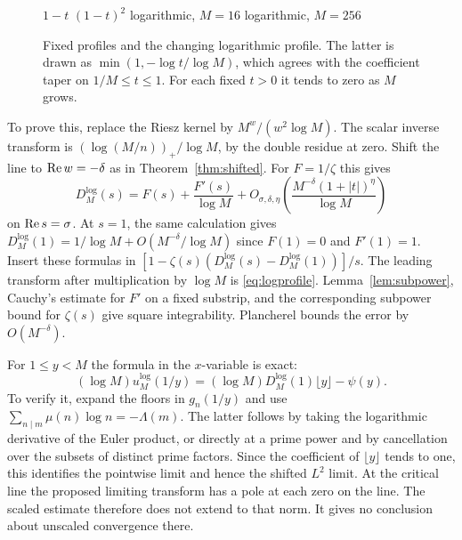 \begin{figure}[ht]
\centering
{}
\par\smallskip
{\small
\textcolor{blue!65!black}{\(1-t\)}\quad
\textcolor{teal!75!black}{\((1-t)^2\)}\quad
\textcolor{orange!85!black}{logarithmic, \(M=16\)}\quad
\textcolor{red!65!black}{logarithmic, \(M=256\)}}
\caption{Fixed profiles and the changing logarithmic profile. The latter is drawn as \(\min(1,-\log t/\log M)\), which agrees with the coefficient taper on \(1/M\le t\le1\). For each fixed \(t>0\) it tends to zero as \(M\) grows.}
\label{fig:tapers}
\end{figure}

To prove this, replace the Riesz kernel by \(M^w/(w^2\log M)\). The scalar inverse transform is \((\log(M/n))_+/\log M\), by the double residue at zero. Shift the line to \(\operatorname{Re} w=-\delta\) as in Theorem~\ref{thm:shifted}. For \(F=1/\zeta\) this gives
\[
 D_M^{\log}(s)=F(s)+\frac{F'(s)}{\log M}
       +O_{\sigma,\delta,\eta}\!\left(
          \frac{M^{-\delta}(1+|t|)^\eta}{\log M}\right)
\]
on \(\operatorname{Re} s=\sigma\). At \(s=1\), the same calculation gives \(D_M^{\log}(1)=1/\log M+O(M^{-\delta}/\log M)\) since \(F(1)=0\) and \(F'(1)=1\). Insert these formulas in \([1-\zeta(s)(D_M^{\log}(s)-D_M^{\log}(1))]/s\). The leading transform after multiplication by \(\log M\) is \eqref{eq:logprofile}. Lemma~\ref{lem:subpower}, Cauchy's estimate for \(F'\) on a fixed substrip, and the corresponding subpower bound for \(\zeta(s)\) give square integrability. Plancherel bounds the error by \(O(M^{-\delta})\).

For \(1\le y<M\) the formula in the \(x\)-variable is exact:
\[
 (\log M)u_M^{\log}(1/y)
  =(\log M)D_M^{\log}(1)\lfloor y\rfloor-\psi(y).
\]
To verify it, expand the floors in \(g_n(1/y)\) and use \(\sum_{n\mid m}\mu(n)\log n=-\Lambda(m)\). The latter follows by taking the logarithmic derivative of the Euler product, or directly at a prime power and by cancellation over the subsets of distinct prime factors. Since the coefficient of \(\lfloor y\rfloor\) tends to one, this identifies the pointwise limit and hence the shifted \(L^2\) limit. At the critical line the proposed limiting transform has a pole at each zero on the line. The scaled estimate therefore does not extend to that norm. It gives no conclusion about unscaled convergence there.

